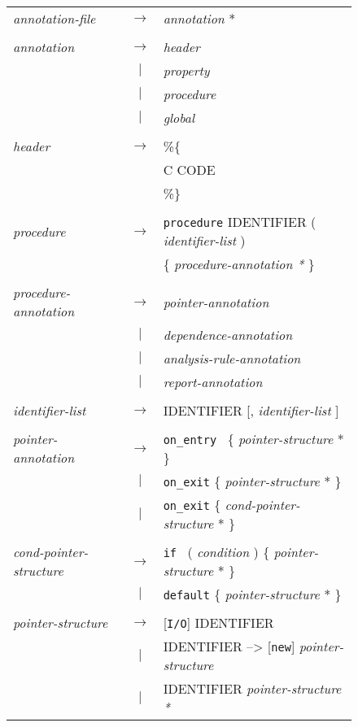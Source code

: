 \documentclass[times, 10pt]{article}
\begin{document}
\begin{figure}
\begin{tabular}[c]{l c l}
{\it annotation-file} & $\rightarrow$ & {\it annotation} * \\
\\
{\it annotation} & $\rightarrow$ & {\it header} \\
& $|$ & {\it property} \\
& $|$ & {\it procedure} \\
& $|$ & {\it global} \\
\\
{\it header} & $\rightarrow$ & \%\{ \\
& & C CODE \\
& & \%\} \\
\\
{\it procedure} & $\rightarrow$ & {\tt procedure} IDENTIFIER ( {\it identifier-list } ) \\
& & \{ {\it procedure-annotation * } \} \\
\\
{\it procedure-annotation} & $\rightarrow$ & {\it pointer-annotation} \\
& $|$ & {\it dependence-annotation} \\
& $|$ & {\it analysis-rule-annotation} \\
& $|$ & {\it report-annotation} \\
\\
{\it identifier-list} & $\rightarrow$ & IDENTIFIER [, {\it identifier-list} ] \\
\\
{\it pointer-annotation} & $\rightarrow$ & {\tt on\_entry } \{ {\it pointer-structure} * \} \\
& $|$ & {\tt on\_exit} \{ {\it pointer-structure} * \} \\
& $|$ & {\tt on\_exit} \{ {\it cond-pointer-structure} * \} \\
\\
{\it cond-pointer-structure} & $\rightarrow$ & {\tt if } ( {\it condition} ) \{ {\it pointer-structure} * \} \\
& $|$ & {\tt default} \{ {\it pointer-structure} * \} \\
\\
{\it pointer-structure} & $\rightarrow$ & [{\tt I/O}] IDENTIFIER \\
& $|$ & IDENTIFIER --\textgreater{} [{\tt new}] {\it pointer-structure} \\
& $|$ & IDENTIFIER {\it pointer-structure * } \\

\end{tabular}
\end{figure}
\end{document}
